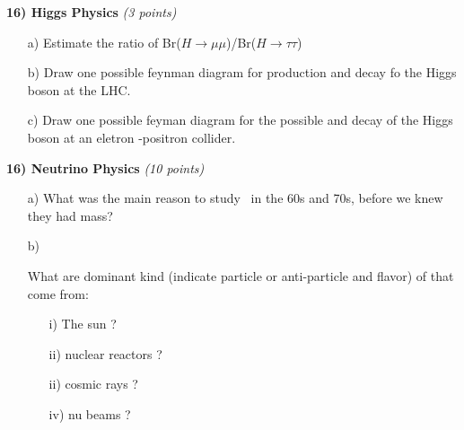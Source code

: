{\textbf{16) Higgs Physics } \textit{(3 points)}\\
\begin{itemize}
\item[a)]{Estimate the ratio of Br($H\rightarrow\mu\mu$)/Br($H\rightarrow\tau\tau$) }
\item[b)]{Draw one possible feynman diagram for production and decay fo the Higgs boson at the LHC.}
\item[c)]{Draw one possible feyman diagram for the possible and decay of the Higgs boson at an eletron -positron collider.}
\end{itemize}


\textbf{16) Neutrino Physics } \hfill \textit{(10 points)}\\
\begin{itemize}
\item[a)]{What was the main reason to study \nus\ in the 60s and 70s, before we knew they had mass?}
\item[b)]{What are dominant kind (indicate particle or anti-particle and flavor) of \nus that come from:
\begin{itemize}
\item[i)]{ The sun ? } 
\item[ii)]{nuclear reactors ? }
\item[ii)]{cosmic rays ? }
\item[iv)]{nu beams ?}
\end{itemize}
}
\end{itemize}





} %

